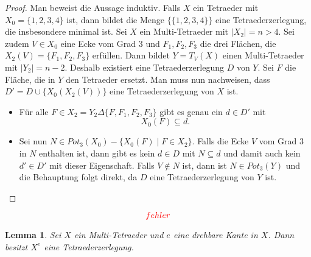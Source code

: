 \documentclass[12pt,titlepage,twoside,cleardoublepage]{article}
\theoremstyle{nummermitklammern}
\newtheorem{lemma}[temp]{Lemma}
\newtheorem{lemma}[zahl]{Lemma}
\numberwithin{equation}{section}
\begin{document}
\begin{proof}
Man beweist die Aussage induktiv. Falls $X$ ein Tetraeder mit $X_0=\{1,2,3,4\}$ ist, dann bildet die Menge $\{\{1,2,3,4\}\}$ eine Tetraederzerlegung, die insbesondere minimal ist.
Sei $X$ ein Multi-Tetraeder mit $\vert X_2\vert =n > 4.$ Sei zudem $V\in X_0$ eine Ecke vom Grad 3 und $F_1,F_2,F_3$ die drei Flächen, die $X_2(V)=\{F_1,F_2,F_3\}$ erfüllen.  Dann bildet $Y=T_V(X)$ einen Multi-Tetraeder mit $\vert Y_2 \vert =n-2.$ Deshalb existiert eine Tetraederzerlegung $D$ von $Y.$ Sei $F$ die Fläche, die in $Y$ den Tetraeder ersetzt. Man muss nun nachweisen, dass $D'=D\cup \{X_0(X_2(V))\}$ eine Tetraederzerlegung von $X$ ist.
\begin{itemize}
\item Für alle $F\in X_2= Y_2 \Delta\{F,F_1,F_2,F_3\}$ gibt es genau ein $d\in D'$ mit 
\[
X_0(F)\subseteq d.
\] 
\item Sei nun $N\in Pot_3(X_0)-\{X_0(F)\mid F\in X_2\}.$ Falls die Ecke $V$ vom Grad 3 in $N$ enthalten ist, 
dann gibt es kein $d\in D$ mit $N\subseteq d$ und damit auch kein $d'\in D'$ mit dieser Eigenschaft. Falls $V\notin N$ ist, dann ist $N\in Pot_3(Y)$ und die Behauptung folgt direkt, da $D$ eine Tetraederzerlegung von $Y$ ist.
\end{itemize}
\end{proof}
\[
\textcolor{red}{fehler}
\]
  \begin{lemma}\label{tzer}
 Sei $X$ ein Multi-Tetraeder und $e$ eine drehbare Kante in $X$. Dann besitzt $X^e$ eine Tetraederzerlegung. 
 \end{lemma}
\end{document}
